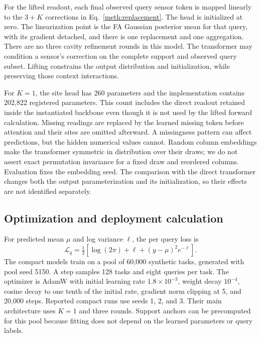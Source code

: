 For the lifted readout, each final observed query sensor token is mapped linearly to the $3+K$ corrections in Eq.~\eqref{meth:replacement}. The head is initialized at zero. The linearization point is the FA Gaussian posterior mean for that query, with its gradient detached, and there is one replacement and one aggregation. There are no three cavity refinement rounds in this model. The transformer may condition a sensor's correction on the complete support and observed query subset. Lifting constrains the output distribution and initialization, while preserving those context interactions.

For $K=1$, the site head has 260 parameters and the implementation contains 202,822 registered parameters. This count includes the direct readout retained inside the instantiated backbone even though it is not used by the lifted forward calculation. Missing readings are replaced by the learned missing token before attention and their sites are omitted afterward. A missingness pattern can affect predictions, but the hidden numerical values cannot. Random column embeddings make the transformer symmetric in distribution over their draws; we do not assert exact permutation invariance for a fixed draw and reordered columns. Evaluation fixes the embedding seed. The comparison with the direct transformer changes both the output parameterization and its initialization, so their effects are not identified separately.

\subsection{Optimization and deployment calculation}

For predicted mean $\mu$ and log variance $\ell$, the per query loss is
\begin{equation}
  \mathcal L_q=\tfrac12\left[\log(2\pi)+\ell
                   +(y-\mu)^2e^{-\ell}\right].
  \label{meth:nll}
\end{equation}
The compact models train on a pool of 60,000 synthetic tasks, generated with pool seed 5150. A step samples 128 tasks and eight queries per task. The optimizer is AdamW with initial learning rate $1.8\times10^{-3}$, weight decay $10^{-4}$, cosine decay to one tenth of the initial rate, gradient norm clipping at 5, and 20,000 steps. Reported compact runs use seeds 1, 2, and 3. Their main architecture uses $K=1$ and three rounds. Support anchors can be precomputed for this pool because fitting does not depend on the learned parameters or query labels.

